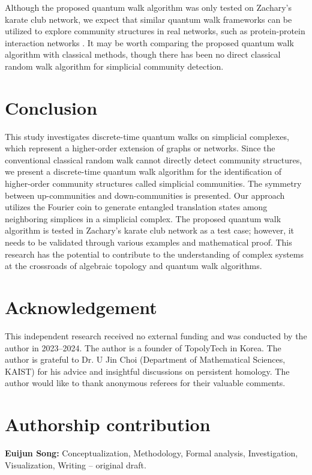 \documentclass[10pt, letterpaper]{article}
\begin{document}
Although the proposed quantum walk algorithm was only tested on Zachary's karate club network, we expect that similar quantum walk frameworks can be utilized to explore community structures in real networks, such as protein-protein interaction networks \cite{Saarinen2023}. It may be worth comparing the proposed quantum walk algorithm with classical methods, though there has been no direct classical random walk algorithm for simplicial community detection.



\section{Conclusion}
This study investigates discrete-time quantum walks on simplicial complexes, which represent a higher-order extension of graphs or networks. Since the conventional classical random walk cannot directly detect community structures, we present a discrete-time quantum walk algorithm for the identification of higher-order community structures called simplicial communities. The symmetry between up-communities and down-communities is presented. Our approach utilizes the Fourier coin to generate entangled translation states among neighboring simplices in a simplicial complex. The proposed quantum walk algorithm is tested in Zachary's karate club network as a test case; however, it needs to be validated through various examples and mathematical proof. This research has the potential to contribute to the understanding of complex systems at the crossroads of algebraic topology and quantum walk algorithms.



\section*{Acknowledgement}
This independent research received no external funding and was conducted by the author in 2023--2024. The author is a founder of TopolyTech in Korea. The author is grateful to Dr. U Jin Choi (Department of Mathematical Sciences, KAIST) for his advice and insightful discussions on persistent homology. The author would like to thank anonymous referees for their valuable comments.


\section*{Authorship contribution}
\textbf{Euijun Song:} Conceptualization, Methodology, Formal analysis, Investigation, Visualization, Writing – original draft.
\end{document}
